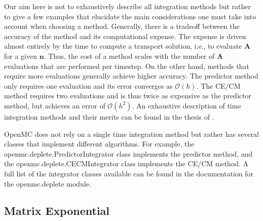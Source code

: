 \documentclass[3p,authoryear]{elsarticle}
\begin{document}
Our aim here is not to exhaustively describe all integration methods but rather
to give a few examples that elucidate the main considerations one must take into
account when choosing a method. Generally, there is a tradeoff between the
accuracy of the method and its computational expense. The expense is driven
almost entirely by the time to compute a transport solution, i.e., to evaluate
$\mathbf{A}$ for a given $\mathbf{n}$. Thus, the cost of a method scales with
the number of $\mathbf{A}$ evaluations that are performed per timestep. On the
other hand, methods that require more evaluations generally achieve higher
accuracy. The predictor method only requires one evaluation and its error
converges as $\mathcal{O}(h)$. The CE/CM method requires two evaluations and is
thus twice as expensive as the predictor method, but achieves an error of
$\mathcal{O}(h^2)$. An exhaustive description of time integration methods and
their merits can be found in the thesis of \citet{josey2017phd}.

OpenMC does not rely on a single time integration method but rather has several
classes that implement different algorithms. For example, the
openmc.deplete.PredictorIntegrator class implements the predictor
method, and the openmc.deplete.CECMIntegrator class implements the
CE/CM method. A full list of the integrator classes available can be found in
the documentation for the openmc.deplete module.

\subsection{Matrix Exponential}
\end{document}
